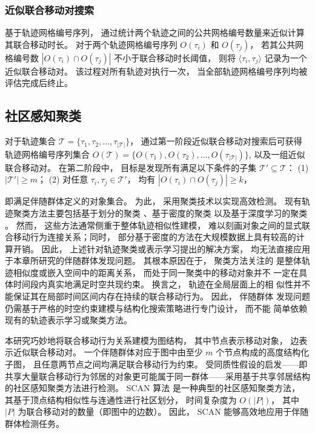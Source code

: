 \subsubsection*{近似联合移动对搜索}

基于轨迹网格编号序列， 通过统计两个轨迹之间的公共网格编号数量来近似计算其联合移动时长。 对于两个轨迹网格编号序列 $O(\tau_i)$ 和 $O(\tau_j)$， 若其公共网格编号数 $|O(\tau_i)\cap O(\tau_j)|$ 不小于联合移动时长阈值， 则将 $\langle \tau_i,\tau_j\rangle$ 记录为一个近似联合移动对。 该过程对所有轨迹对执行一次， 当全部轨迹网格编号序列均被评估完成后终止。

\subsection{社区感知聚类}

对于轨迹集合 $\mathcal{T}=\{\tau_1,\tau_2,\ldots,\tau_{|\mathcal{T}|}\}$， 通过第一阶段近似联合移动对搜索后可获得轨迹网格编号序列集合
$O(\mathcal{T})=\{O(\tau_1),O(\tau_2),\ldots,O(\tau_{|\mathcal{T}|})\}$,
以及一组近似联合移动对。 在第二阶段中， 目标是发现所有满足以下条件的子集 $\mathcal{T}'\subseteq \mathcal{T}$：
(1) $|\mathcal{T}'|\geq m$；
(2) 对任意 $\tau_i,\tau_j\in\mathcal{T}'$， 均有 $|O(\tau_i)\cap O(\tau_j)|\geq k$，

即满足伴随群体定义的对象集合。 为此， 采用聚类技术以实现高效检测。 现有轨迹聚类方法主要包括基于划分的聚类 、基于密度的聚类  以及基于深度学习的聚类 。 然而， 这些方法通常侧重于整体轨迹相似性建模， 难以刻画对象之间的显式联合移动行为连接关系；同时， 部分基于密度的方法在大规模数据上具有较高的计算开销。 因此， 上述针对轨迹聚类或表示学习提出的解决方案， 均无法直接应用于本章所研究的伴随群体发现问题。 其根本原因在于， 聚类方法关注的
是整体轨迹相似度或嵌入空间中的距离关系， 而处于同一聚类中的移动对象并不
一定在具体时间段内真实地满足时空共现约束。 换言之， 轨迹在全局层面上的相
似性并不能保证其在局部时间区间内存在持续的联合移动行为。 因此， 伴随群体
发现问题仍需基于严格的时空约束建模与结构化搜索策略进行专门设计， 而不能
简单依赖现有的轨迹表示学习或聚类方法。

本研究巧妙地将联合移动行为关系建模为图结构， 其中节点表示移动对象， 边表示近似联合移动对。 一个伴随群体对应于图中由至少 $m$ 个节点构成的高度结构化子图， 且任意两节点之间均满足联合移动行为约束。 受同质性假设的启发——即共享大量联合移动行为邻居的对象更可能属于同一群体——采用基于共享邻居结构的社区感知聚类方法进行检测。 SCAN 算法  是一种典型的社区感知聚类方法， 其基于顶点结构相似性与连通性进行社区划分， 时间复杂度为 $O(|P|)$， 其中 $|P|$ 为联合移动对的数量（即图中的边数）。 因此， SCAN 能够高效地应用于伴随群体检测任务。

